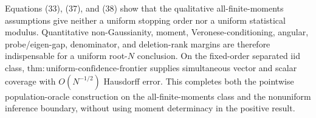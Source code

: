 Equations (33), (37), and (38) show that the qualitative all-finite-moments assumptions give neither a uniform stopping order nor a uniform statistical modulus. Quantitative non-Gaussianity, moment, Veronese-conditioning, angular, probe/eigen-gap, denominator, and deletion-rank margins are therefore indispensable for a uniform root-\(N\) conclusion. On the fixed-order separated iid class, \(\mathrm{thm:uniform\text{-}confidence\text{-}frontier}\) supplies simultaneous vector and scalar coverage with \(O(N^{-1/2})\) Hausdorff error. This completes both the pointwise population-oracle construction on the all-finite-moments class and the nonuniform inference boundary, without using moment determinacy in the positive result.